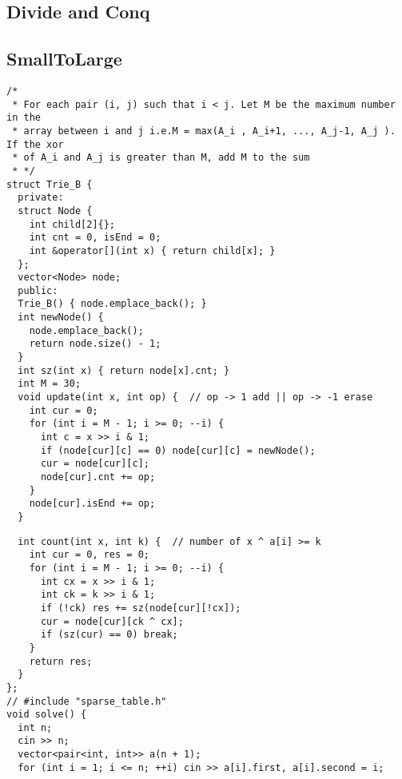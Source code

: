 \documentclass[twoside]{article}
\begin{document}
\begin{multicols*}{2}
{
\section*{Divide and Conq}
}
{
\subsection*{SmallToLarge}
}
\begin{verbatim}
/*
 * For each pair (i, j) such that i < j. Let M be the maximum number in the
 * array between i and j i.e.M = max(A_i , A_i+1, ..., A_j-1, A_j ). If the xor
 * of A_i and A_j is greater than M, add M to the sum
 * */
struct Trie_B {
  private:
  struct Node {
    int child[2]{};
    int cnt = 0, isEnd = 0;
    int &operator[](int x) { return child[x]; }
  };
  vector<Node> node;
  public:
  Trie_B() { node.emplace_back(); }
  int newNode() {
    node.emplace_back();
    return node.size() - 1;
  }
  int sz(int x) { return node[x].cnt; }
  int M = 30;
  void update(int x, int op) {  // op -> 1 add || op -> -1 erase
    int cur = 0;
    for (int i = M - 1; i >= 0; --i) {
      int c = x >> i & 1;
      if (node[cur][c] == 0) node[cur][c] = newNode();
      cur = node[cur][c];
      node[cur].cnt += op;
    }
    node[cur].isEnd += op;
  }
\end{verbatim}
\vspace{-12pt}
\begin{verbatim}
  int count(int x, int k) {  // number of x ^ a[i] >= k
    int cur = 0, res = 0;
    for (int i = M - 1; i >= 0; --i) {
      int cx = x >> i & 1;
      int ck = k >> i & 1;
      if (!ck) res += sz(node[cur][!cx]);
      cur = node[cur][ck ^ cx];
      if (sz(cur) == 0) break;
    }
    return res;
  }
};
// #include "sparse_table.h"
void solve() {
  int n;
  cin >> n;
  vector<pair<int, int>> a(n + 1);
  for (int i = 1; i <= n; ++i) cin >> a[i].first, a[i].second = i;

\end{verbatim}
\end{multicols*}
\end{document}
